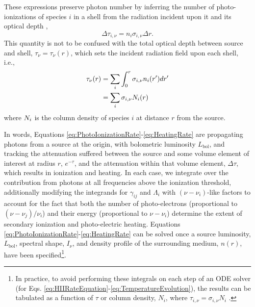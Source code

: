 These expressions preserve photon number by inferring the number of photo-ionizations of species $i$ in a shell from the radiation incident upon it and its optical depth \cite{Abel1999},
\begin{equation}
    \Delta \tau_{i,\nu} = n_i \sigma_{i,\nu} \Delta r .
\end{equation}    
This quantity is not to be confused with the total optical depth between source and shell, $\tau_{\nu} = \tau_{\nu}(r)$, which sets the incident radiation field upon each shell, i.e.,
\begin{align}
    \tau_{\nu}(r) & = \sum_i \int_0^r \sigma_{i,\nu} n_i(r^{\prime}) dr^{\prime} \nonumber \\
                  & = \sum_i \sigma_{i,\nu} N_i(r) \label{eq:OpticalDepth}
\end{align}
where $N_i$ is the column density of species $i$ at distance $r$ from the
source.

In words, Equations \ref{eq:PhotoIonizationRate}-\ref{eq:HeatingRate} are propagating photons from a source at the origin, with bolometric luminosity $L_{\mathrm{bol}}$, and tracking the attenuation suffered between the source and some volume element of interest at radius $r$, $e^{-\tau}$, and the attenuation within that volume element, $\Delta \tau$, which results in ionization and heating. In each case, we integrate over the contribution from photons at all frequencies above the ionization threshold, additionally modifying the integrands for $\gamma_{ij}$ and $\Lambda_i$ with $(\nu - \nu_i)$-like factors to account for the fact that both the number of photo-electrons (proportional to $(\nu - \nu_j) / \nu_i$) and their energy (proportional to $\nu - \nu_i$) determine the extent of secondary ionization and photo-electric heating. Equations \ref{eq:PhotoIonizationRate}-\ref{eq:HeatingRate} can be solved once a source luminosity, $L_{\mathrm{bol}}$, spectral shape, $I_{\nu}$, and density profile of the surrounding medium, $n(r)$, have been specified\footnote{In practice, to avoid performing these integrals on each step of an ODE solver (for Eqs. \ref{eq:HIIRateEquation}-\ref{eq:TemperatureEvolution}), the results can be tabulated as a function of $\tau$ or column density, $N_i$, where $\tau_{i,\nu}=\sigma_{i,\nu} N_i$ \cite{Thomas2008,Mirocha2012,Knevitt2014}.}.  


